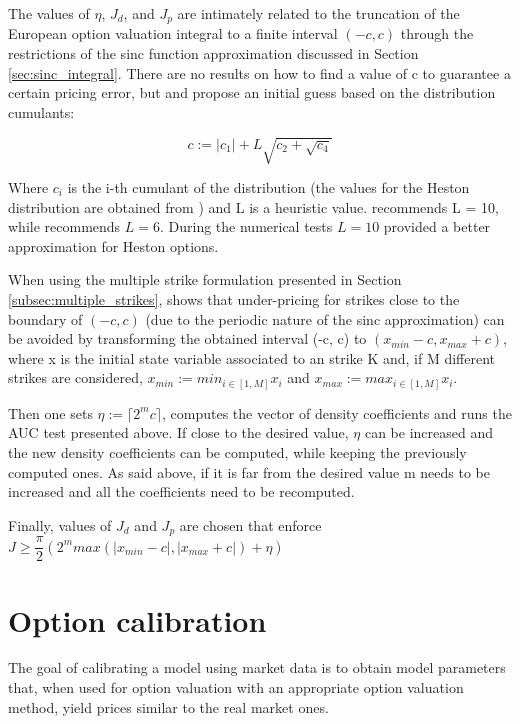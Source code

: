 \documentclass[12,twoside]{mammeTFM}
\theoremstyle{definition}
\theoremstyle{remark}
\begin{document}
The values of $\eta$, $J_d$, and $J_p$ are intimately related to the truncation of the European option valuation integral to a finite interval $(-c, c)$ through the restrictions of the sinc function approximation discussed in Section \ref{sec:sinc_integral}. There are no results on how to find a value of c to guarantee a certain pricing error, but \cite{Ortiz-Gracia2016} and \cite{cui17} propose an initial guess based on the distribution cumulants:

\begin{equation}
c := |c_1| + L \sqrt{c_2 + \sqrt{c_4}}
\end{equation}

Where $c_i$ is the i-th cumulant of the distribution (the values for the Heston distribution are obtained from \cite{bor10}) and L is a heuristic value. \cite{Ortiz-Gracia2016} recommends L = 10, while \cite{mar17} recommends $L = 6$. During the numerical tests $L = 10$ provided a better approximation for Heston options.

When using the multiple strike formulation presented in Section \ref{subsec:multiple_strikes}, \cite{mar17} shows that under-pricing for strikes close to the boundary of $(-c, c)$ (due to the periodic nature of the sinc approximation) can be avoided by transforming the obtained interval (-c, c) to $(x_{min} - c, x_{max} + c)$, where x is the initial state variable associated to an strike K and, if M different strikes are considered, $x_{min} := min_{i \in [1, M]} x_i$ and $x_{max} := max_{i \in [1, M]} x_i$.

Then one sets $\eta := \lceil 2^m c \rceil$, computes the vector of density coefficients and runs the AUC test presented above. If close to the desired value, $\eta$ can be increased and the new density coefficients can be computed, while keeping the previously computed ones. As said above, if it is far from the desired value m needs to be increased and all the coefficients need to be recomputed.

Finally, values of $J_d$ and $J_p$ are chosen that enforce $J \geq \dfrac{\pi}{2}(2^m max(|x_{min} - c|, |x_{max} + c|) + \eta)$

\section{Option calibration} \label{chap:optimization_problem}
The goal of calibrating a model using market data is to obtain model parameters that, when used for option valuation with an appropriate option valuation method, yield prices similar to the real market ones.
\end{document}
